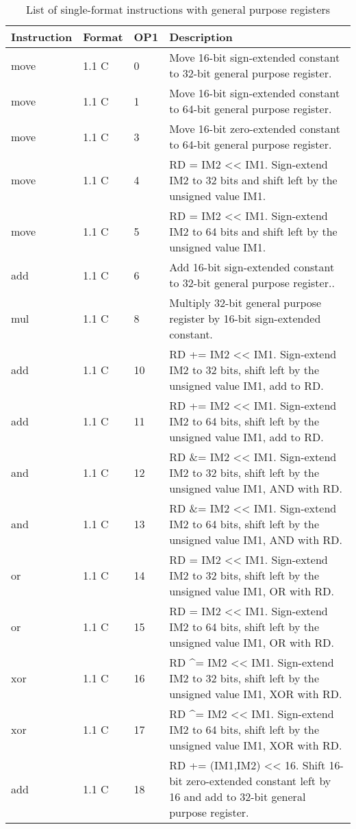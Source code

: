 \documentclass[forwardcom.tex]{subfiles}
\begin{document}
\begin{longtable} {|p{25mm}|p{14mm}|p{10mm}|p{95mm}|}
\caption{List of single-format instructions with general purpose registers} 
\label{table:ListOfSingleFormatInstructionsGP} \\
\endfirsthead
\endhead
\hline
\bfseries Instruction & \bfseries Format &\bfseries OP1 & \bfseries Description \\
\hline
move          & 1.1 C &  0 & Move 16-bit sign-extended constant to 32-bit general purpose register. \\
move          & 1.1 C &  1 & Move 16-bit sign-extended constant to 64-bit general purpose register. \\
move          & 1.1 C &  3 & Move 16-bit zero-extended constant to 64-bit general purpose register. \\
move          & 1.1 C & 4  & RD = IM2 \textless\textless{} IM1. Sign-extend IM2 to 32 bits and shift left by the unsigned value IM1. \\
move          & 1.1 C & 5  & RD = IM2 \textless\textless{} IM1. Sign-extend IM2 to 64 bits and shift left by the unsigned value IM1. \\
add           & 1.1 C &  6  & Add 16-bit sign-extended constant to 32-bit general purpose register.. \\
mul           & 1.1 C &  8  & Multiply 32-bit general purpose register by 16-bit sign-extended constant. \\
add           & 1.1 C & 10  & RD += IM2 \textless\textless{} IM1. Sign-extend IM2 to 32 bits, shift left by the unsigned value IM1, add to RD. \\
add           & 1.1 C & 11  & RD += IM2 \textless\textless{} IM1. Sign-extend IM2 to 64 bits, shift left by the unsigned value IM1, add to RD. \\
and           & 1.1 C & 12  & RD \&= IM2 \textless\textless{} IM1. Sign-extend IM2 to 32 bits, shift left by the unsigned value IM1, AND with RD. \\
and           & 1.1 C & 13  & RD \&= IM2 \textless\textless{} IM1. Sign-extend IM2 to 64 bits, shift left by the unsigned value IM1, AND with RD. \\
or            & 1.1 C & 14  & RD \textbar{}= IM2 \textless\textless{} IM1. Sign-extend IM2 to 32 bits, shift left by the unsigned value IM1, OR with RD. \\
or            & 1.1 C & 15  & RD \textbar{}= IM2 \textless\textless{} IM1. Sign-extend IM2 to 64 bits, shift left by the unsigned value IM1, OR with RD. \\
xor           & 1.1 C & 16  & RD \^{}= IM2 \textless\textless{} IM1. Sign-extend IM2 to 32 bits, shift left by the unsigned value IM1, XOR with RD. \\
xor           & 1.1 C & 17  & RD \^{}= IM2 \textless\textless{} IM1. Sign-extend IM2 to 64 bits, shift left by the unsigned value IM1, XOR with RD. \\
add           & 1.1 C & 18  & RD += (IM1,IM2) \textless\textless{} 16. Shift 16-bit zero-extended constant left by 16 and add to 32-bit general purpose register. \\


\end{longtable}
\end{document}
